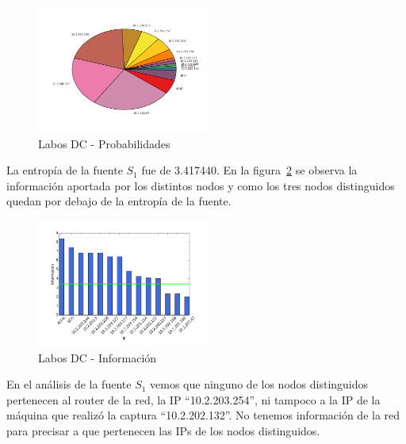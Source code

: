 \documentclass[final,inline,narroweqnarray,a4paper]{ieee}
\begin{document}
\begin{figure}[H]
    \begin{center}
        \includegraphics[width=0.5\textwidth]{plot/laboDcS1-pie.png}
        \caption{Labos DC - Probabilidades}
        \label{torta:laboDcS1}
    \end{center}
\end{figure} 

La entropía de la fuente $S_1$ fue de 3.417440. En la figura~\ref{histo:laboDcS1} se observa la información aportada por los distintos nodos y como los tres nodos distinguidos quedan por debajo de la entropía de la fuente. 

\begin{figure}[H]
    \begin{center}
        \includegraphics[width=0.5\textwidth]{plot/laboDcS1-bar.png}
        \caption{Labos DC - Información}
        \label{histo:laboDcS1}
    \end{center}
\end{figure}

En el análisis de la fuente $S_1$ vemos que ninguno de los nodos distinguidos pertenecen al router de la red, la IP ``10.2.203.254'', ni tampoco a la IP de la máquina que realizó la captura ``10.2.202.132''. No tenemos información de la red para precisar a que pertenecen las IPs de los nodos distinguidos.

\end{document}
